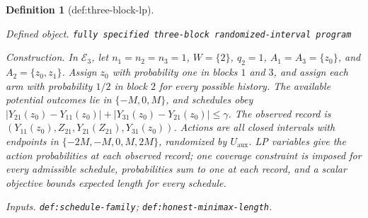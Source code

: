\documentclass{article}
\newtheorem{definition}{Definition}
\begin{document}
\begin{definition}[def:three-block-lp]\label{def:three-block-lp}
\par\smallskip\noindent\emph{Defined object.} \texttt{fully specified three-\allowbreak{}block randomized-\allowbreak{}interval program}
\par\smallskip\noindent\emph{Construction.} In \(\mathcal E_3\), let \(n_1=n_2=n_3=1\), \(W=\{2\}\), \(q_2=1\), \(A_1=A_3=\{z_0\}\), and \(A_2=\{z_0,z_1\}\). Assign \(z_0\) with probability one in blocks \(1\) and \(3\), and assign each arm with probability \(1/2\) in block \(2\) for every possible history. The available potential outcomes lie in \(\{-M,0,M\}\), and schedules obey \(|Y_{21}(z_0)-Y_{11}(z_0)|+|Y_{31}(z_0)-Y_{21}(z_0)|\le\gamma\). The observed record is \((Y_{11}(z_0),Z_{21},Y_{21}(Z_{21}),Y_{31}(z_0))\). Actions are all closed intervals with endpoints in \(\{-2M,-M,0,M,2M\}\), randomized by \(U_{\mathrm{aux}}\). LP variables give the action probabilities at each observed record; one coverage constraint is imposed for every admissible schedule, probabilities sum to one at each record, and a scalar objective bounds expected length for every schedule.
\par\smallskip\noindent\emph{Inputs.} \texttt{def:\allowbreak{}schedule-\allowbreak{}family}; \texttt{def:\allowbreak{}honest-\allowbreak{}minimax-\allowbreak{}length}.
\end{definition}
\end{document}
